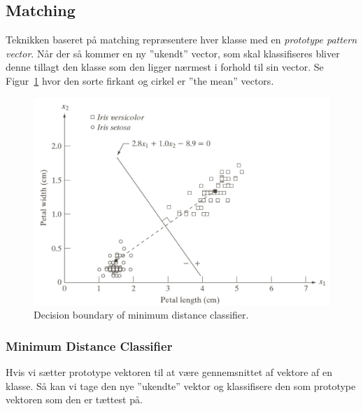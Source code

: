 \subsection{Matching}

Teknikken baseret på matching repræsentere hver klasse med en \textit{prototype pattern vector}. Når der så kommer en ny ''ukendt'' vector, som skal klassifiseres bliver denne tillagt den klasse som den ligger nærmest i forhold til sin vector. Se Figur~\ref{fig:decision-boundary} hvor den sorte firkant og cirkel er ''the mean'' vectors.

\begin{figure}[h]
	\centering
	\includegraphics[width=0.9\linewidth]{figs/spm12/decision-boundary}
	\caption{Decision boundary of minimum distance classifier.}
	\label{fig:decision-boundary}
\end{figure}

\subsubsection{Minimum Distance Classifier}

Hvis vi sætter prototype vektoren til at være gennemsnittet af vektore af en klasse. Så kan vi tage den nye ''ukendte'' vektor og klassifisere den som prototype vektoren som den er tættest på.

